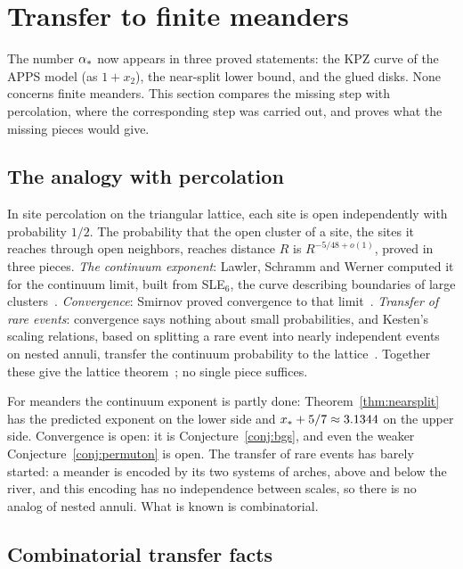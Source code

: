 \section{Transfer to finite meanders}\label{sec:bridge}

The number $\alpha_*$ now appears in three proved statements: the KPZ curve of the APPS model (as
$1+x_2$), the near-split lower bound, and the glued disks. None concerns finite meanders. This section compares
the missing step with percolation, where the corresponding step was carried out, and proves what the
missing pieces would give.

\subsection{The analogy with percolation}

In site percolation on the triangular lattice, each site is open independently with probability
$1/2$. The probability that the open cluster of a site, the sites it reaches through open
neighbors, reaches distance $R$ is $R^{-5/48+o(1)}$, proved in three pieces. \emph{The continuum
exponent}: Lawler, Schramm and Werner computed it for the continuum limit, built from SLE$_6$, the
curve describing boundaries of large clusters~\cite{LSW}. \emph{Convergence}: Smirnov proved
convergence to that limit~\cite{Smirnov}. \emph{Transfer of rare events}: convergence says nothing
about small probabilities, and Kesten's scaling relations, based on splitting a rare event into
nearly independent events on nested annuli, transfer the continuum probability to the
lattice~\cite{Kesten}. Together these give the lattice theorem~\cite{LSW,SW}; no single piece
suffices.

For meanders the continuum exponent is partly done: Theorem~\ref{thm:nearsplit} has the predicted
exponent on the lower side and $x_*+5/7\approx3.1344$ on the upper side. Convergence is open:
it is Conjecture~\ref{conj:bgs}, and even the weaker Conjecture~\ref{conj:permuton} is open. The
transfer of rare events has barely started: a meander is encoded by its two systems of arches,
above and below the river, and this encoding has no independence between scales, so there is no
analog of nested annuli. What is known is combinatorial.

\subsection{Combinatorial transfer facts}

